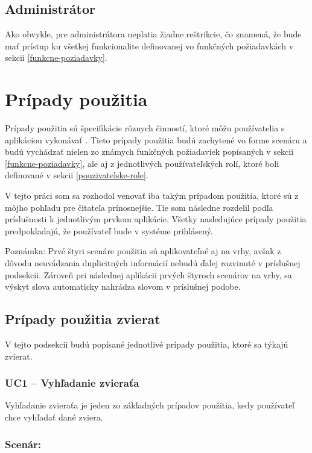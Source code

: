 \subsection{Administrátor}\label{administrator}
Ako obvykle, pre administrátora neplatia žiadne reštrikcie, čo znamená, že bude mať prístup ku všetkej funkcionalite definovanej vo funkčných požiadavkách v sekcii \ref{funkcne-poziadavky}.

\section{Prípady použitia}\label{pripady-pouzitia}
Prípady použitia sú špecifikácie rôznych činností, ktoré môžu používatelia s aplikáciou vykonávať \cite{co-su-pripady-pouzitia}. Tieto prípady použitia budú zachytené vo forme scenáru a budú vychádzať nielen zo známych funkčných požiadaviek popísaných v sekcii \ref{funkcne-poziadavky}, ale aj z jednotlivých používateľských rolí, ktoré boli definované v sekcii \ref{pouzivatelske-role}.

V tejto práci som sa rozhodol venovať iba takým prípadom použitia, ktoré sú z môjho pohľadu pre čitateľa prínosnejšie. Tie som následne rozdelil podľa príslušnosti k jednotlivým prvkom aplikácie. Všetky nasledujúce prípady použitia predpokladajú, že používateľ bude v systéme prihlásený.

\hfill \break
Poznámka: Prvé štyri scenáre použitia sú aplikovateľné aj na vrhy, avšak z dôvodu neuvádzania duplicitných informácií nebudú ďalej rozvinuté v príslušnej podsekcii. Zároveň pri následnej aplikácii prvých štyroch scenárov na vrhy, sa výskyt slova  automaticky nahrádza slovom  v príslušnej podobe.

\subsection{Prípady použitia zvierat}
V tejto podsekcii budú popísané jednotlivé prípady použitia, ktoré sa týkajú zvierat.

\subsubsection*{UC1 -- Vyhľadanie zvieraťa}\label{uc1}

Vyhľadanie zvieraťa je jeden zo základných prípadov použitia, kedy používateľ chce vyhľadať dané zviera.

\subsubsection*{Scenár:}

